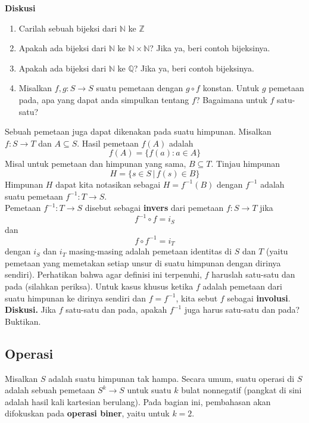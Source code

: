	\textbf{Diskusi}
	\begin{enumerate}
		\item Carilah sebuah bijeksi dari $\mathbb{N}$ ke $\mathbb{Z}$
		\item Apakah ada bijeksi dari $\mathbb{N}$ ke $\mathbb{N} \times \mathbb{N}$? Jika ya, beri contoh bijeksinya.
		\item Apakah ada bijeksi dari $\mathbb{N}$ ke $\mathbb{Q}$? Jika ya, beri contoh bijeksinya.
		\item Misalkan $f,g: S \rightarrow S$ suatu pemetaan dengan $g \circ f$ konstan. Untuk $g$ pemetaan pada, apa yang dapat anda simpulkan tentang $f$? Bagaimana untuk $f$ satu-satu?
	\end{enumerate}

	Sebuah pemetaan juga dapat dikenakan pada suatu himpunan. Misalkan $f: S \rightarrow T$ dan $A \subseteq S$. Hasil pemetaan $f(A)$ adalah $$f(A) = \{ f(a) : a \in A \}$$
	Misal untuk pemetaan dan himpunan yang sama, $B \subseteq T$. Tinjau himpunan $$H = \{ s \in S \, | \, f(s) \in B \}$$
	Himpunan $H$ dapat kita notasikan sebagai $H = f^{-1}(B)$ dengan $f^{-1}$ adalah suatu pemetaan $f^{-1}: T \rightarrow S$.
	\\
	
	Pemetaan $f^{-1}: T \rightarrow S$ disebut sebagai \textbf{invers} dari pemetaan $f: S \rightarrow T$ jika
	$$f^{-1} \circ f = i_S$$ dan $$f \circ f^{-1} = i_T$$
	dengan $i_S$ dan $i_T$ masing-masing adalah pemetaan identitas di $S$ dan $T$ (yaitu pemetaan yang memetakan setiap unsur di suatu himpunan dengan dirinya sendiri). Perhatikan bahwa agar definisi ini terpenuhi, $f$ haruslah satu-satu dan pada (silahkan periksa). Untuk kasus khusus ketika $f$ adalah pemetaan dari suatu himpunan ke dirinya sendiri dan $f = f^{-1}$, kita sebut $f$ sebagai \textbf{involusi}.
	\\
	
	\textbf{Diskusi. }Jika $f$ satu-satu dan pada, apakah $f^{-1}$ juga harus satu-satu dan pada? Buktikan.
	\subsection{Operasi}
	Misalkan $S$ adalah suatu himpunan tak hampa. Secara umum, suatu operasi di $S$ adalah sebuah pemetaan $S^k \rightarrow S$ untuk suatu $k$ bulat nonnegatif (pangkat di sini adalah hasil kali kartesian berulang). Pada bagian ini, pembahasan akan difokuskan pada \textbf{operasi biner}, yaitu untuk $k = 2$.
	\\
	
